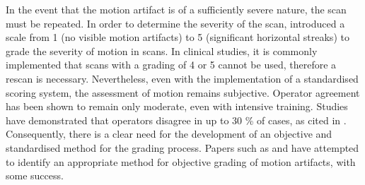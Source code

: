 \documentclass[
a4paper, 
12pt,
grayscalebody, %
abstract=on,
twoside, BCOR10mm, 12pt, DIV13,headinclude, footexclude, final, abstracton, openright
]{ibireprt}
\numberwithin{equation}{chapter}
\numberwithin{table}{chapter}
\numberwithin{figure}{chapter}
\numberwithin{algorithm}{chapter}
\numberwithin{example}{chapter}
\numberwithin{example}{chapter}
\begin{document}
In the event that the motion artifact is of a sufficiently severe nature, the scan must be repeated. In order to determine the severity of the scan, \citet{Whittier2020} introduced a scale from 1 (no visible motion artifacts) to 5 (significant horizontal streaks) to grade the severity of motion in scans. In clinical studies, it is commonly implemented that scans with a grading of 4 or 5 cannot be used, therefore a rescan is necessary. Nevertheless, even with the implementation of a standardised scoring system, the assessment of motion remains subjective. Operator agreement has been shown to remain only moderate, even with intensive training. Studies have demonstrated that operators disagree in up to 30 \% of cases, as cited in  \citep{Walle2023}. Consequently, there is a clear need for the development of an objective and standardised method for the grading process. Papers such as \citet{Walle2023} and \citet{Sode2011} have attempted to identify an appropriate method for objective grading of motion artifacts, with some success.

\end{document}
